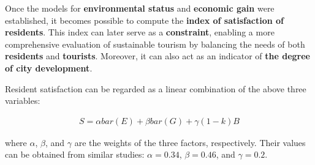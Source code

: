 \documentclass[UTF8]{mcmthesis}
\begin{document}
        \hspace*{2em} Once the models for \textbf{environmental status} and \textbf{economic gain} were established, it becomes possible to compute the \textbf{index of satisfaction of residents}. This index can later serve as a \textbf{constraint}, enabling a more comprehensive evaluation of sustainable tourism by balancing the needs of both \textbf{residents} and \textbf{tourists}. Moreover, it can also act as an indicator of \textbf{the degree of city development}.
        



    Resident satisfaction can be regarded as a linear combination of the above three variables:

    \begin{equation}
        \begin{aligned}
S = \alpha bar(E)+\beta bar(G) +\gamma(1-k)B
        \end{aligned}
        \end{equation}

        where $\alpha$, $\beta$, and $\gamma$ are the weights of the three factors, respectively. Their values can be obtained from similar studies\cite{Cottrell}: $\alpha = 0.34$, $\beta = 0.46$, and $\gamma = 0.2$.
\end{document}
